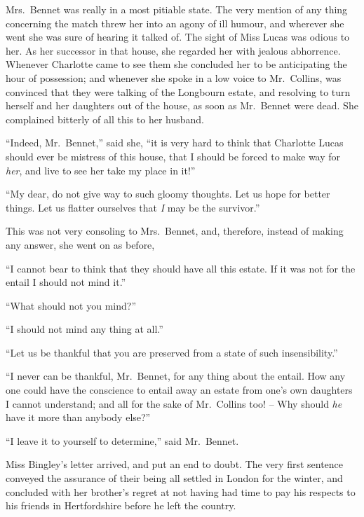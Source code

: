 Mrs.\ Bennet was really in a most pitiable state. The
very mention of any thing concerning the match threw
her into an agony of ill humour, and wherever she went
she was sure of hearing it talked of. The sight of Miss
Lucas was odious to her. As her successor in that house,
she regarded her with jealous abhorrence. Whenever
Charlotte came to see them she concluded her to be
anticipating the hour of possession; and whenever she
spoke in a low voice to Mr.\ Collins, was convinced that
they were talking of the Longbourn estate, and resolving
to turn herself and her daughters out of the house, as soon
as Mr.\ Bennet were dead. She complained bitterly of all
this to her husband.

“Indeed, Mr.\ Bennet,” said she, “it is very hard to
think that Charlotte Lucas should ever be mistress of
this house, that I should be forced to make way for \textit{her},
and live to see her take my place in it!”

“My dear, do not give way to such gloomy thoughts.
Let us hope for better things. Let us flatter ourselves
that \textit{I} may be the survivor.”

This was not very consoling to Mrs.\ Bennet, and, therefore,
instead of making any answer, she went on as before,

“I cannot bear to think that they should have all
this estate. If it was not for the entail I should not
mind it.”

“What should not you mind?”

“I should not mind any thing at all.”

“Let us be thankful that you are preserved from a state
of such insensibility.”

“I never can be thankful, Mr.\ Bennet, for any thing
about the entail. How any one could have the conscience
to entail away an estate from one’s own daughters
I cannot understand; and all for the sake of Mr.\ Collins
too! -- Why should \textit{he} have it more than anybody else?”

“I leave it to yourself to determine,” said Mr.\ Bennet.




Miss Bingley’s letter arrived, and put an end to doubt.
The very first sentence conveyed the assurance of their
being all settled in London for the winter, and concluded
with her brother’s regret at not having had time to pay
his respects to his friends in Hertfordshire before he left
the country.

